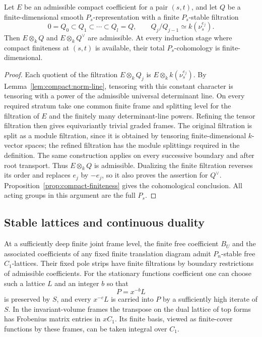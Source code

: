 \begin{corollary}
\label{cor:compact:norm-filtration}
Let $E$ be an admissible compact coefficient for a pair $(s,t)$,
and let $Q$ be a finite-dimensional smooth $P_s$-representation
with a finite $P_s$-stable filtration
\[
        0=Q_0\subset Q_1\subset\cdots\subset Q_l=Q,
        \qquad Q_j/Q_{j-1}\simeq k(\nu_s^{e_j}).
\]
Then $E\otimes_k Q$ and $E\otimes_k Q^\vee$ are admissible.
At every induction stage where compact finiteness at $(s,t)$ is
available, their total $P_s$-cohomology is finite-dimensional.
\end{corollary}

\begin{proof}
Each quotient of the filtration $E\otimes_k Q_j$ is
$E\otimes_k k(\nu_s^{e_j})$.  By
Lemma~\ref{lem:compact:norm-line}, tensoring with this constant
character is tensoring with a power of the admissible universal
determinant line.  On every required stratum take one common finite
frame and splitting level for the filtration of $E$ and the
finitely many determinant-line powers.  Refining the tensor
filtration then gives equivariantly trivial graded frames.
The original filtration is split as a module filtration, since it
is obtained by tensoring finite-dimensional $k$-vector spaces;
the refined filtration has the module splittings required in the
definition.  The same construction applies on every successive
boundary and after root transport.  Thus $E\otimes_k Q$ is
admissible.  Dualizing the finite filtration reverses its order
and replaces $e_j$ by $-e_j$, so it also proves the assertion for
$Q^\vee$.  Proposition~\ref{prop:compact-finiteness} gives the
cohomological conclusion.  All acting groups in this argument
are the full $P_s$.
\end{proof}

\subsection{Stable lattices and continuous duality}

\begin{lemma}
\label{lem:compact:stable-lattices}
At a sufficiently deep finite joint frame level, the finite free
coefficient $B_U$ and the associated coefficients of any fixed finite
translation diagram admit $P_n$-stable free $C_1$-lattices.  Their fixed
pole strips have finite filtrations by boundary restrictions of
admissible coefficients.  For the stationary functions coefficient one
can choose such a lattice $L$ and an integer $b$ so that
\[
                    P=x^{-b}L
\]
is preserved by $S$, and every $x^{-c}L$ is carried into $P$ by a
sufficiently high iterate of $S$.  In the invariant-volume frames the
transpose on the dual lattice of top forms has Frobenius matrix entries
in $xC_1$.  Its finite basis, viewed as finite-cover functions by these
frames, can be taken integral over $C_1$.
\end{lemma}

